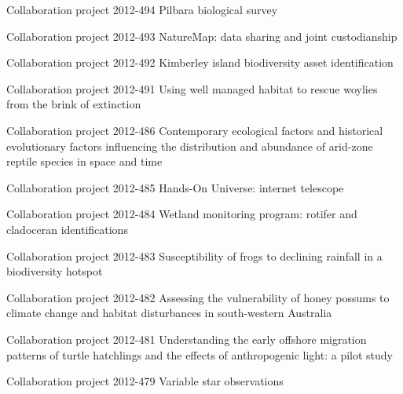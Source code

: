 \documentclass[version=last, paper=a4, DIV=18, usenames, dvipsnames]{scrartcl}
\begin{document}
\begin{longtabu}
  Collaboration project 2012-494 Pilbara biological survey \newline  \\ \hline

  Collaboration project 2012-493 NatureMap: data sharing and joint custodianship \newline  \\ \hline

  Collaboration project 2012-492 Kimberley island biodiversity asset identification \newline  \\ \hline

  Collaboration project 2012-491 Using well managed habitat to rescue woylies from the brink of extinction \newline  \\ \hline

  Collaboration project 2012-486 Contemporary ecological factors and historical evolutionary factors influencing the distribution and abundance of arid-zone reptile species in space and time \newline  \\ \hline

  Collaboration project 2012-485 Hands-On Universe: internet telescope \newline  \\ \hline

  Collaboration project 2012-484 Wetland monitoring program: rotifer and cladoceran identifications \newline  \\ \hline

  Collaboration project 2012-483 Susceptibility of frogs to declining rainfall in a biodiversity hotspot \newline  \\ \hline

  Collaboration project 2012-482 Assessing the vulnerability of honey possums to climate change and habitat disturbances in south-western Australia \newline  \\ \hline

  Collaboration project 2012-481 Understanding the early offshore migration patterns of turtle hatchlings and the effects of anthropogenic light: a pilot study \newline  \\ \hline

  Collaboration project 2012-479 Variable star observations \newline  \\ \hline


\end{longtabu}
\end{document}
